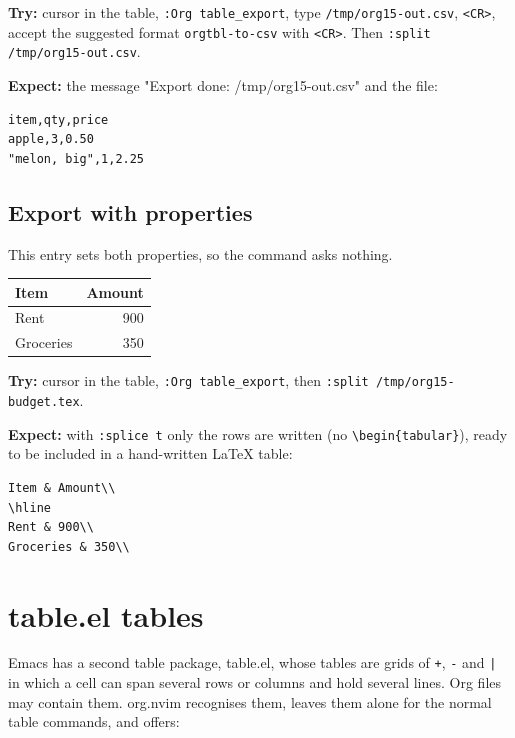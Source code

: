 \textbf{Try:} cursor in the table, \texttt{:Org table\_export}, type \texttt{/tmp/org15-out.csv},
\texttt{<CR>}, accept the suggested format \texttt{orgtbl-to-csv} with \texttt{<CR>}. Then
\texttt{:split /tmp/org15-out.csv}.

\textbf{Expect:} the message "Export done: /tmp/org15-out.csv" and the file:
\begin{verbatim}
item,qty,price
apple,3,0.50
"melon, big",1,2.25
\end{verbatim}
\subsection{Export with properties}
\label{sec:org2580b9d}
This entry sets both properties, so the command asks nothing.

\begin{center}
\begin{tabular}{lr}
Item & Amount\\
\hline
Rent & 900\\
Groceries & 350\\
\end{tabular}
\end{center}

\textbf{Try:} cursor in the table, \texttt{:Org table\_export}, then
\texttt{:split /tmp/org15-budget.tex}.

\textbf{Expect:} with \texttt{:splice t} only the rows are written (no \texttt{\textbackslash{}begin\{tabular\}}),
ready to be included in a hand-written \LaTeX{} table:
\begin{verbatim}
Item & Amount\\
\hline
Rent & 900\\
Groceries & 350\\
\end{verbatim}
\section{table.el tables}
\label{sec:orgd269a94}
Emacs has a second table package, table.el, whose tables are grids of \texttt{+},
\texttt{-} and \texttt{|} in which a cell can span several rows or columns and hold
several lines. Org files may contain them. org.nvim recognises them, leaves
them alone for the normal table commands, and offers:

